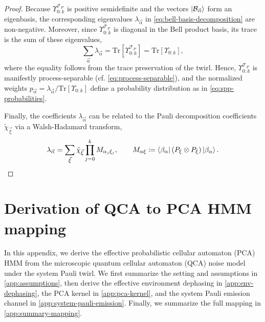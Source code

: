 \documentclass[
    aps,
    prx,
    reprint,
    superscriptaddress,
    longbibliography,
    nofootinbib,
    floatfix,
]{revtex4-2}
\newcommand{\Tr}{\mathrm{Tr}}
\begin{document}
\begin{proof}
    Because \(\Upsilon_{0:k}^{\mathcal{T}_P}\) is positive semidefinite and the vectors \(\ket{\mathcal{B}_{\vec{\alpha}}}\) form an eigenbasis, the corresponding eigenvalues \(\lambda_{\vec{\alpha}}\) in \cref{eq:bell-basis-decomposition} are non-negative. Moreover, since \(\Upsilon_{0:k}^{\mathcal{T}_P}\) is diagonal in the Bell product basis, its trace is the sum of these eigenvalues,
    \begin{equation}
        \sum_{\vec{\alpha}} \lambda_{\vec{\alpha}} = \Tr[\Upsilon_{0:k}^{\mathcal{T}_P}] = \Tr[\Upsilon_{0:k}],
    \end{equation}
    where the equality follows from the trace preservation of the twirl. Hence, \(\Upsilon_{0:k}^{\mathcal{T}_P}\) is manifestly process-separable (cf. \cref{eq:process-separable}), and the normalized weights \(p_{\vec{\alpha}} = \lambda_{\vec{\alpha}} / \Tr[\Upsilon_{0:k}]\) define a probability distribution as in \cref{eq:spp-probabilities}.

    Finally, the coefficients \(\lambda_{\vec{\alpha}}\) can be related to the Pauli decomposition coefficients \(\tilde{\chi}_{\vec{\xi}}\) via a Walsh-Hadamard transform,
    \begin{equation}
        \lambda_{\vec{\alpha}} = \sum_{\vec{\xi}} \tilde{\chi}_{\vec{\xi}} \prod_{j=0}^k M_{\alpha_j\xi_j},
         \qquad
         M_{\alpha\xi} \coloneq \bra{\beta_\alpha}(P_\xi\otimes P_\xi)\ket{\beta_\alpha}.
    \end{equation}
\end{proof}

\section{Derivation of QCA to PCA HMM mapping}\label{app:qca-pca-mapping}
In this appendix, we derive the effective probabilistic cellular automaton (PCA) HMM from the microscopic quantum cellular automaton (QCA) noise model under the system Pauli twirl. We first summarize the setting and assumptions in \cref{app:assumptions}, then derive the effective environment dephasing in \cref{app:env-dephasing}, the PCA kernel in \cref{app:pca-kernel}, and the system Pauli emission channel in \cref{app:system-pauli-emission}. Finally, we summarize the full mapping in \cref{app:summary-mapping}.
\end{document}
